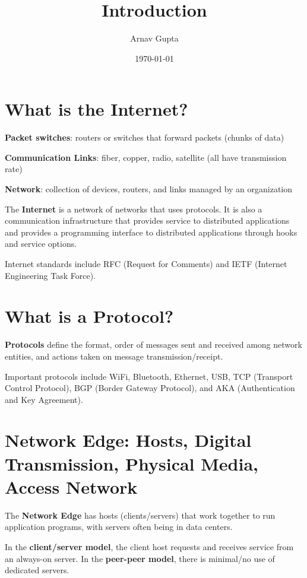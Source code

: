 \documentclass[11pt]{article}
\author{Arnav Gupta}
\date{\today}
\title{Introduction}
\begin{document}
\maketitle
\tableofcontents

\section{What is the Internet?}
\label{sec:orgafd23fc}

\textbf{Packet switches}: routers or switches that forward packets (chunks of data)

\textbf{Communication Links}: fiber, copper, radio, satellite (all have transmission rate)

\textbf{Network}: collection of devices, routers, and links managed by an organization

The \textbf{Internet} is a network of networks that uses protocols.
It is also a communication infrastructure that provides service to distributed applications
and provides a programming interface to distributed applications through hooks and service options.

Internet standards include RFC (Request for Comments) and IETF (Internet Engineering Task Force).
\section{What is a Protocol?}
\label{sec:orgaa2432c}

\textbf{Protocols} define the format, order of messages sent and received among network entities, and
actions taken on message transmission/receipt.

Important protocols include WiFi, Bluetooth, Ethernet, USB, TCP (Transport Control Protocol),
BGP (Border Gateway Protocol), and AKA (Authentication and Key Agreement).
\section{Network Edge: Hosts, Digital Transmission, Physical Media, Access Network}
\label{sec:org68f713f}

The \textbf{Network Edge} has hosts (clients/servers) that work together to run application programs, with
servers often being in data centers.

In the \textbf{client/server model}, the client host requests and receives service from an always-on server.
In the \textbf{peer-peer model}, there is minimal/no use of dedicated servers.
\end{document}
